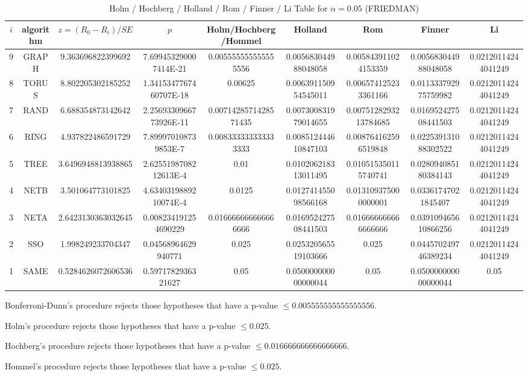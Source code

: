 \documentclass[a4paper,10pt]{article}
\begin{document}
\begin{landscape}
\begin{table}[!htp]
\centering\scriptsize
\caption{Holm / Hochberg / Holland / Rom / Finner / Li Table for $\alpha=0.05$ (FRIEDMAN)}
\begin{tabular}{ccccccccc}
$i$&algorithm&$z=(R_0 - R_i)/SE$&$p$&Holm/Hochberg/Hommel&Holland&Rom&Finner&Li\\
\hline
9& GRAPH&9.363696822399692&7.699453290007414E-21&0.005555555555555556&0.005683044988048058&0.005843911024153359&0.005683044988048058&0.02120114244041249\\
8& TORUS&8.802205302185252&1.3415347767460707E-18&0.00625&0.006391150954545011&0.006574125233361166&0.011333792975759982&0.02120114244041249\\
7& RAND&6.688354873142642&2.2569330966773926E-11&0.0071428571428571435&0.007300831979014655&0.0075128293213784685&0.016952427508441503&0.02120114244041249\\
6& RING&4.937822486591729&7.899970108739853E-7&0.008333333333333333&0.008512444610847103&0.008764162596519848&0.022539131088302522&0.02120114244041249\\
5& TREE&3.6496948813938865&2.6255198708212613E-4&0.01&0.010206218313011495&0.010515350115740741&0.028094085180384143&0.02120114244041249\\
4& NETB&3.501064773101825&4.6340319889210074E-4&0.0125&0.012741455098566168&0.013109375000000001&0.03361747021845407&0.02120114244041249\\
3& NETA&2.6423130363032645&0.008234191254690229&0.016666666666666666&0.016952427508441503&0.016666666666666666&0.039109465610866256&0.02120114244041249\\
2& SSO&1.998249233704347&0.04568964629940771&0.025&0.025320565519103666&0.025&0.044570249746389234&0.02120114244041249\\
1& SAME&0.5284626072606536&0.5971782936321627&0.05&0.050000000000000044&0.05&0.050000000000000044&0.05\\
\hline
\end{tabular}
\end{table}
Bonferroni-Dunn's procedure rejects those hypotheses that have a p-value $\le0.005555555555555556$.


Holm's procedure rejects those hypotheses that have a p-value $\le0.025$.


Hochberg's procedure rejects those hypotheses that have a p-value $\le0.016666666666666666$.


Hommel's procedure rejects those hypotheses that have a p-value $\le0.025$.



\end{landscape}
\end{document}

